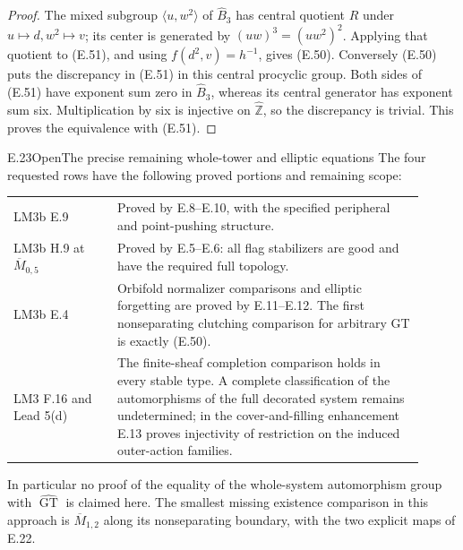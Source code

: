 \begin{proof}
The mixed subgroup $\langle u,w^2\rangle$ of
$\widehat B_3$ has central quotient $R$ under
$u\mapsto d,w^2\mapsto v$; its center is generated
by $(uw)^3=(uw^2)^2$.  Applying that quotient to
(E.51), and using $f(d^2,v)=h^{-1}$, gives (E.50).
Conversely (E.50) puts the discrepancy in (E.51)
in this central procyclic group.  Both sides of
(E.51) have exponent sum zero in $\widehat B_3$,
whereas its central generator has exponent sum six.
Multiplication by six is injective on
$\widehat{\mathbb Z}$, so the discrepancy is trivial.
This proves the equivalence with (E.51).
\end{proof}

\begin{result}{E.23}{Open}{The precise remaining whole-tower and elliptic equations}
The four requested rows have the following proved portions
and remaining scope:
\begin{center}
\begin{tabular}{p{0.23\linewidth}|p{0.68\linewidth}}
LM3b E.9 & Proved by E.8--E.10, with the specified
peripheral and point-pushing structure.\\
LM3b H.9 at $\overline M_{0,5}$ & Proved by E.5--E.6:
all flag stabilizers are good and have the required full topology.\\
LM3b E.4 & Orbifold normalizer comparisons and elliptic
forgetting are proved by E.11--E.12. The first nonseparating
clutching comparison for arbitrary GT is exactly (E.50).\\
LM3 F.16 and Lead 5(d) & The finite-sheaf completion
comparison holds in every stable type. A complete classification
of the automorphisms of the full decorated system remains
undetermined; in the cover-and-filling enhancement E.13 proves
injectivity of restriction on the induced outer-action families.
\end{tabular}
\end{center}
In particular no proof of the equality of the whole-system
automorphism group with $\widehat{\operatorname{GT}}$ is
claimed here.  The smallest missing existence comparison
in this approach is $\overline M_{1,2}$ along its
nonseparating boundary, with the two explicit maps of E.22.
\end{result}
